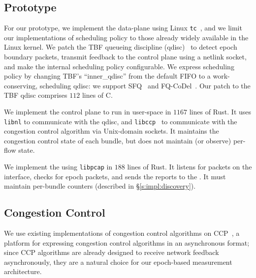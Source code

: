 \subsection{Prototype}\label{s:impl:prototype}
For our prototype, we implement the \inbox data-plane using Linux \texttt{tc}~\cite{tc}, and we limit our implementations of scheduling policy to those already widely available in the Linux kernel.
We patch the TBF queueing discipline (qdisc)~\cite{tbf} to detect epoch boundary packets, transmit feedback to the control plane using a netlink socket, and make the internal scheduling policy configurable.
We express scheduling policy by changing TBF's ``inner\_qdisc'' from the default FIFO to a work-conserving, scheduling qdisc: we support SFQ~\cite{sfq} and FQ-CoDel~\cite{fq-codel}.
Our patch to the TBF qdisc comprises $112$ lines of C.

We implement the \inbox control plane to run in user-space in $1167$ lines of Rust. 
It uses \texttt{libnl} to communicate with the qdisc, and \texttt{libccp}~\cite{ccp} to communicate with the congestion control algorithm via Unix-domain sockets.
It maintains the congestion control state of each bundle, but does not maintain (or observe) per-flow state.

We implement the \outbox using \texttt{libpcap} in $188$ lines of Rust. It listens for packets on the interface, checks for epoch packets, and sends the reports to the \inbox. It must maintain per-bundle counters (described in \S\ref{s:impl:discovery}).



\subsection{Congestion Control}\label{s:impl:cc}
We use existing implementations of congestion control algorithms on CCP~\cite{ccp}, a platform for expressing congestion control algorithms in an asynchronous format; since CCP algorithms are already designed to receive network feedback asynchronously, they are a natural choice for our epoch-based measurement architecture. 

